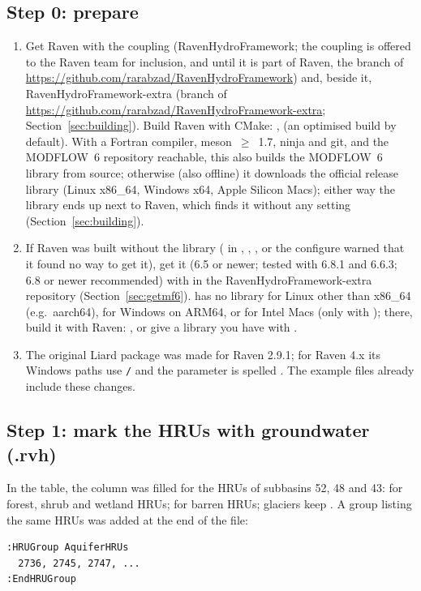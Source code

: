 \subsection{Step 0: prepare}
\begin{enumerate}
\item Get Raven with the coupling (RavenHydroFramework; the coupling is offered to the Raven team for inclusion, and
until it is part of Raven, the  branch of \url{https://github.com/rarabzad/RavenHydroFramework}) and, beside it, RavenHydroFramework-extra (branch  of
\url{https://github.com/rarabzad/RavenHydroFramework-extra}; Section~\ref{sec:building}). Build Raven with CMake: ,  (an optimised  build by default). With a Fortran compiler, meson~$\geq$~1.7, ninja and git,
and the MODFLOW~6 repository reachable, this also builds the MODFLOW~6 library from source; otherwise (also offline) it
downloads the official release library (Linux x86\_64, Windows x64, Apple Silicon Macs); either
way the library ends up next to Raven, which finds it without any setting (Section~\ref{sec:building}).
\item If Raven was built without the library ( in , , , or
the configure warned that it found no way to get it), get it (6.5 or newer; tested with 6.8.1 and 6.6.3; 6.8 or newer
recommended) with  in the RavenHydroFramework-extra repository
(Section~\ref{sec:getmf6}).  has no library for Linux other than x86\_64 (e.g.\ aarch64), for Windows on
ARM64, or for Intel Macs (only with ); there, build it with Raven: , or give a library you have with .
\item The original Liard package was made for Raven 2.9.1; for Raven 4.x its Windows paths use \texttt{/} and the parameter
 is spelled . The example files already include these changes.
\end{enumerate}

\subsection{Step 1: mark the HRUs with groundwater (.rvh)}
In the  table, the  column was filled for the HRUs of subbasins 52, 48 and 43:
 for forest, shrub and wetland HRUs;  for barren HRUs; glaciers keep \cmd{[NONE]}.
A group listing the same HRUs was added at the end of the file:
\par\noindent\begin{minipage}{\linewidth}
\begin{lstlisting}
:HRUGroup AquiferHRUs
  2736, 2745, 2747, ...
:EndHRUGroup
\end{lstlisting}
\end{minipage}\par\smallskip

